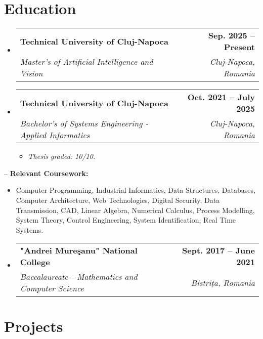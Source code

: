 \documentclass[letterpaper,11pt]{article}
\makeatletter
\newcommand{\resumeItem}[1]{
  \item\small{
    {#1 \vspace{-2pt}}
  }
}
\newcommand{\resumeSubheading}[4]{
  \vspace{-2pt}\item
    \begin{tabular*}{1.0\textwidth}[t]{l@{\extracolsep{\fill}}r}
      \textbf{#1} & \textbf{\small #2} \\
      \textit{\small#3} & \textit{\small #4} \\
    \end{tabular*}\vspace{-7pt}
}
\newcommand{\resumeProjectHeading}[2]{
    \item
    \begin{tabular*}{1.001\textwidth}{l@{\extracolsep{\fill}}r}
      \small#1 & \textbf{\small #2}\\
    \end{tabular*}\vspace{-7pt}
}
\newcommand{\resumeSubHeadingListStart}{\begin{itemize}[leftmargin=0.0in, label={}]}
\newcommand{\resumeSubHeadingListEnd}{\end{itemize}}
\newcommand{\resumeItemListStart}{\begin{itemize}}
\newcommand{\resumeItemListEnd}{\end{itemize}\vspace{-5pt}}
\makeatother
\begin{document}
\section{Education}
  \resumeSubHeadingListStart
    \resumeSubheading
      {Technical University of Cluj-Napoca}{Sep. 2025 -- Present}
      {Master's of Artificial Intelligence and Vision}{Cluj-Napoca, Romania}
    \resumeSubheading
      {Technical University of Cluj-Napoca}{Oct. 2021 -- July 2025}
      {Bachelor's of Systems Engineering - Applied Informatics}{Cluj-Napoca, Romania}
      \resumeItemListStart
        \resumeItem{\emph{Thesis graded: 10/10.}}
      \resumeItemListEnd
  \resumeSubHeadingListEnd
  
-- {\textbf{Relevant Coursework:}}
 \resumeItemListStart
        \resumeItem{
 Computer Programming, Industrial Informatics, Data Structures, Databases, Computer Architecture, Web Technologies, Digital Security, Data Transmission, CAD, Linear Algebra, Numerical Calculus, Process Modelling, System Theory, Control Engineering, System Identification, Real Time Systems.}
    \resumeItemListEnd
\resumeSubHeadingListStart
\resumeSubheading
      {"Andrei Mureşanu" National College}{Sept. 2017 -- June 2021}
      {Baccalaureate - Mathematics and Computer Science}{Bistrița, Romania}
  \resumeSubHeadingListEnd  

\section{Projects}

\begin{comment}
    

\vspace{-5pt}
    \resumeSubHeadingListStart
      \resumeProjectHeading
          {\textbf{ Full-Stack E-commerce Website for PC Components} $|$ \emph{ASP .NET Core, React, Vite, Entity Framework}}{Ongoing}
          \resumeItemListStart
          \resumeItem{Leading a team in the development of a full-stack e-commerce platform specializing in PC components. Collaborating closely with team members to optimize website performance and ensure responsive design across various devices.}
            \resumeItem{Spearheading the implementation of user-friendly interfaces to ensure seamless browsing and purchasing experiences.}
            \resumeItem{Overseeing the integration of robust security measures to safeguard user data and transactions.}
    \resumeItemListEnd
    \resumeSubHeadingListEnd
   \end{comment}
\end{document}
